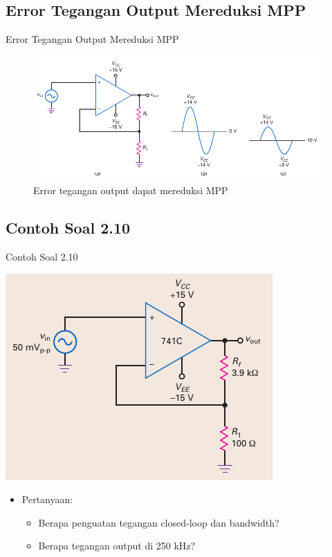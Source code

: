 \subsection{Error Tegangan Output Mereduksi MPP}
\begin{frame}{Error Tegangan Output Mereduksi MPP}
	\begin{figure}
		\centering
		\includegraphics[width=0.9\linewidth]{gambar/fig-16.21}
		\caption{Error tegangan output dapat mereduksi MPP}
		\label{fig-16.21}
	\end{figure}
\end{frame}

\subsection{Contoh Soal 2.10}
\begin{frame}{Contoh Soal 2.10}
	\begin{multicols}{2}
		\begin{center}
			\includegraphics[width=\linewidth]{gambar/fig-16.22a}
		\end{center}
		\columnbreak
		\begin{itemize}
			\item Pertanyaan:
			\begin{itemize}
				\item Berapa penguatan tegangan closed-loop dan bandwidth?
				\item Berapa tegangan output di 250 kHz?
			\end{itemize}
		\end{itemize}
	\end{multicols}
\end{frame}

